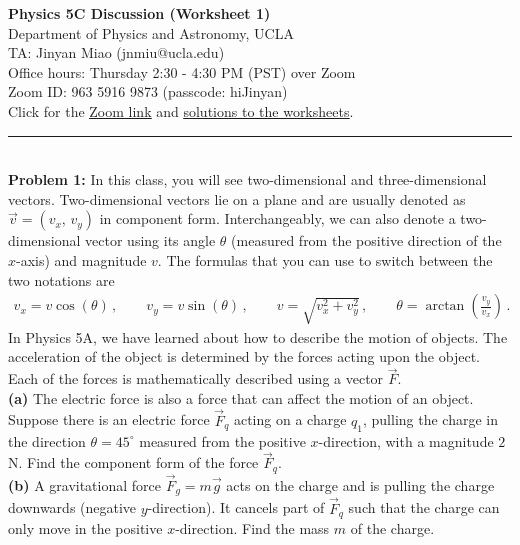\documentclass[11pt]{article}
\begin{document}
\Large \noindent \textbf{Physics 5C Discussion (Worksheet 1)}\\
\normalsize
Department of Physics and Astronomy, UCLA\\

\noindent TA: Jinyan Miao (jnmiu@ucla.edu)\\
Office hours: Thursday 2:30 - 4:30 PM (PST) over Zoom \\
Zoom ID: 963 5916 9873 (passcode: hiJinyan)\\
Click for the \href{https://ucla.zoom.us/j/96359169873?pwd=05p7ssCPwTbl8KfxoBNCOuaIbt68jW.1}{\underline{Zoom link}} and \href{https://sites.google.com/umich.edu/jmiu/worksheets}{\underline{solutions to the worksheets}}.\\
\noindent\rule{8cm}{0.4pt}\\

\noindent\textbf{Problem 1:} In this class, you will see two-dimensional and three-dimensional vectors. Two-dimensional vectors lie on a plane and are usually denoted as $\vec{v} = (v_x,\,v_y)$ in component form. Interchangeably, we can also denote a two-dimensional vector using its angle $\theta$ (measured from the positive direction of the $x$-axis) and magnitude $v$. The formulas that you can use to switch between the two notations are
\begin{align*}
v_x = v\cos(\theta)\,,\qquad
v_y = v\sin(\theta)\,,\qquad
v = \sqrt{v_x^2 + v_y^2}\,,\qquad
\theta = \arctan\left(\frac{v_y}{v_x}\right)\,.
\end{align*}
In Physics 5A, we have learned about how to describe the motion of objects. The acceleration of the object is determined by the forces acting upon the object. Each of the forces is mathematically described using a vector $\vec{F}$. \\

\noindent\textbf{(a)} The electric force is also a force that can affect the motion of an object. Suppose there is an electric force $\vec{F}_q$ acting on a charge $q_1$, pulling the charge in the direction $\theta = 45^\circ$ measured from the positive $x$-direction, with a magnitude $2\,$N. Find the component form of the force $\vec{F}_q$.\\

\noindent\textbf{(b)} A gravitational force $\vec{F}_g = m\vec{g}$ acts on the charge and is pulling the charge downwards (negative $y$-direction). It cancels part of $\vec{F}_q$ such that the charge can only move in the positive $x$-direction. Find the mass $m$ of the charge.\\
\end{document}
